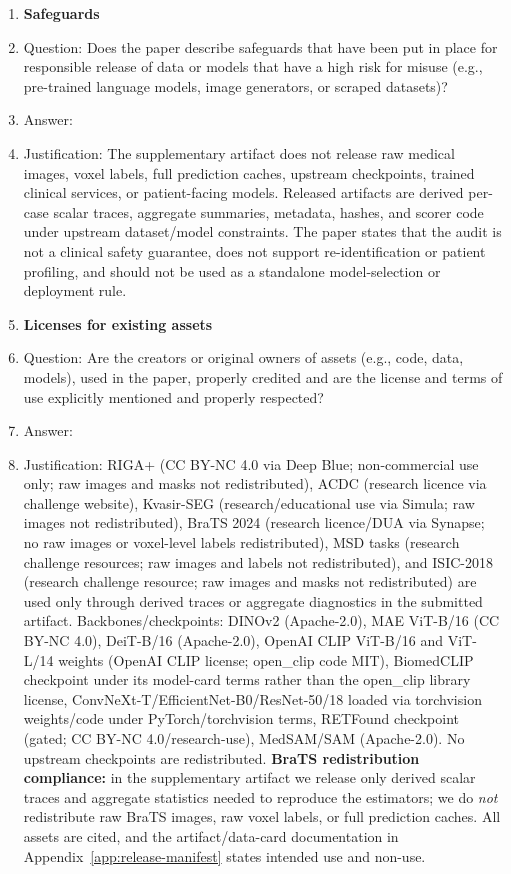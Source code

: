 \begin{enumerate}[leftmargin=*,itemsep=2pt,parsep=0pt,topsep=2pt]
\item {\bf Safeguards}
    \item[] Question: Does the paper describe safeguards that have been put in place for responsible release of data or models that have a high risk for misuse (e.g., pre-trained language models, image generators, or scraped datasets)?
    \item[] Answer: \answerYes{}
    \item[] Justification: The supplementary artifact does not release raw medical images, voxel labels, full prediction caches, upstream checkpoints, trained clinical services, or patient-facing models. Released artifacts are derived per-case scalar traces, aggregate summaries, metadata, hashes, and scorer code under upstream dataset/model constraints. The paper states that the audit is not a clinical safety guarantee, does not support re-identification or patient profiling, and should not be used as a standalone model-selection or deployment rule.

\item {\bf Licenses for existing assets}
    \item[] Question: Are the creators or original owners of assets (e.g., code, data, models), used in the paper, properly credited and are the license and terms of use explicitly mentioned and properly respected?
    \item[] Answer: \answerYes{}
\item[] Justification: RIGA+ (CC BY-NC 4.0 via Deep Blue; non-commercial use only; raw images and masks not redistributed), ACDC (research licence via challenge website), Kvasir-SEG (research/educational use via Simula; raw images not redistributed), BraTS 2024 (research licence/DUA via Synapse; no raw images or voxel-level labels redistributed), MSD tasks (research challenge resources; raw images and labels not redistributed), and ISIC-2018 (research challenge resource; raw images and masks not redistributed) are used only through derived traces or aggregate diagnostics in the submitted artifact. Backbones/checkpoints: DINOv2 (Apache-2.0), MAE ViT-B/16 (CC BY-NC 4.0), DeiT-B/16 (Apache-2.0), OpenAI CLIP ViT-B/16 and ViT-L/14 weights (OpenAI CLIP license; open\_clip code MIT), BiomedCLIP checkpoint under its model-card terms rather than the open\_clip library license, ConvNeXt-T/EfficientNet-B0/ResNet-50/18 loaded via torchvision weights/code under PyTorch/torchvision terms, RETFound checkpoint (gated; CC BY-NC 4.0/research-use), MedSAM/SAM (Apache-2.0). No upstream checkpoints are redistributed. \textbf{BraTS redistribution compliance:} in the supplementary artifact we release only derived scalar traces and aggregate statistics needed to reproduce the estimators; we do \emph{not} redistribute raw BraTS images, raw voxel labels, or full prediction caches. All assets are cited, and the artifact/data-card documentation in Appendix~\ref{app:release-manifest} states intended use and non-use.


\end{enumerate}
